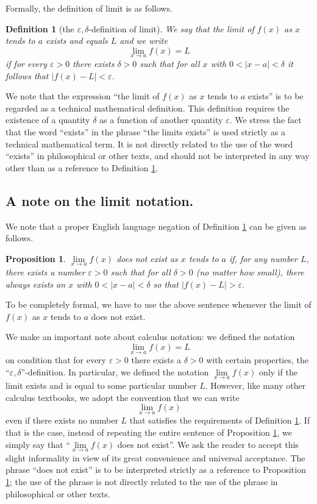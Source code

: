 \documentclass[12pt]{book}
\newtheorem{definition}[theorem]{Definition}
\newtheorem{prop}[theorem]{Proposition}
\begin{document}
Formally, the definition of limit is as follows.
\begin{definition}[the $\varepsilon, \delta$-definition of limit] \label{defLimit}
We say that the limit of $f(x)$ as $x$ tends to $a$ exists and equals $L$ and we write
\[
\lim_{x\to a} f(x)=L
\]
if for every $\varepsilon>0$ there exists $\delta>0$ such that for all $x$ with $0<|x-a|<\delta$ it follows that  $|f(x)-L|<\varepsilon$.
\end{definition}
We note that the expression ``the limit of $f(x)$ as $x$ tends to $a$ exists'' is to be regarded as a technical mathematical definition. This definition requires the existence of a quantity $\delta$ as a function of another quantity $\varepsilon $. We stress the fact that the word ``exists'' in the phrase ``the limits exists'' is used strictly as a technical mathematical term. It is not directly related to the use of the word ``exists'' in philosophical or other texts, and should not be interpreted in any way other than as a reference to Definition \ref{defLimit}.
\subsection{A note on the limit notation.}
We note that a proper English language negation of Definition \ref{defLimit} can be given as follows.
\begin{prop}\label{propLimitDoesntExist}
$\lim\limits_{x\to a}f(x) $ does not exist as $x$ tends to $a$ if, for any number $L$, there exists a number $\varepsilon>0$ such that for all $\delta>0$ (no matter how small), there always exists an $x$ with $0<|x-a|<\delta$ so that $|f(x)-L|>\varepsilon$.
\end{prop}
To be completely formal, we have to use the above sentence whenever the limit of $f(x)$ as $x$ tends to $a$ does not exist.


We make an important note about calculus notation: we defined the notation
\[
\lim\limits_{x\to a} f(x)=L
\]
on condition that for every $\varepsilon>0$ there exists a $\delta>0$ with certain properties,  the ``$\varepsilon, \delta$''-definition. In particular, we defined the notation $\lim\limits_{x\to a}f(x)$ only if the limit exists and is equal to some particular number $L$. However, like many other calculus textbooks, we adopt the convention that we can write
\[
\lim\limits_{x\to a}f(x)
\]
even if there exists no number $L$ that satisfies the requirements of Definition \ref{defLimit}. If that is the case, instead of repeating the entire sentence of Proposition \ref{propLimitDoesntExist}, we simply say that ``$\lim\limits_{x\to a}f(x)$ does not exist''. We ask the reader to accept this slight informality in view of its great convenience and universal acceptance. The phrase ``does not exist'' is to be interpreted strictly as a reference to Proposition \ref{propLimitDoesntExist}; the use of the phrase is not directly related to the use of the phrase in philosophical or other texts.
\end{document}
